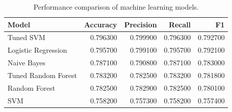 \begin{table}
\caption{Performance comparison of machine learning models.}
\label{tab:model_comparison}
\begin{tabular}{lrrrr}
\toprule
Model & Accuracy & Precision & Recall & F1 \\
\midrule
Tuned SVM & 0.796300 & 0.799900 & 0.796300 & 0.792700 \\
Logistic Regression & 0.795700 & 0.799100 & 0.795700 & 0.792100 \\
Naive Bayes & 0.787100 & 0.790800 & 0.787100 & 0.783000 \\
Tuned Random Forest & 0.783200 & 0.782500 & 0.783200 & 0.781800 \\
Random Forest & 0.782500 & 0.782900 & 0.782500 & 0.780100 \\
SVM & 0.758200 & 0.757300 & 0.758200 & 0.757400 \\
\bottomrule
\end{tabular}
\end{table}
